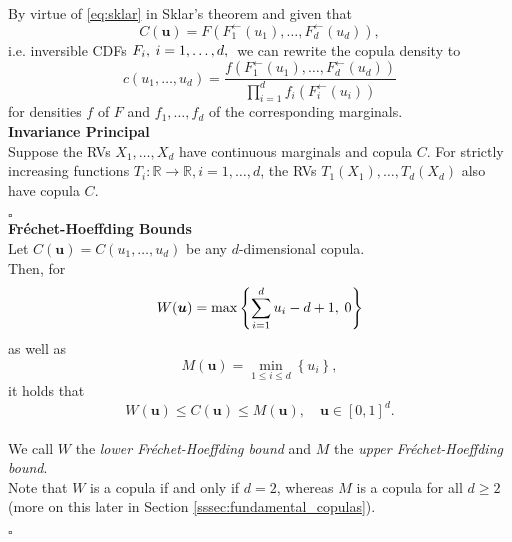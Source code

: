 By virtue of \autoref{eq:sklar} in Sklar's theorem and given that
\begin{equation} 
C(\mathbf{u})=F\left(F_{1}^{\leftarrow}\left(u_{1}\right), \ldots, F_{d}^{\leftarrow}\left(u_{d}\right)\right) ,
\label{eq:sklar_2}
\end{equation}
i.e. inversible \ac{CDF}s $ F_i, \hspace{0.25em} i = 1, \ldots, d, \hspace{0.25em}$ we can rewrite the copula density to
\begin{equation}
c\left(u_{1}, \ldots, u_{d}\right)=\frac{f\left(F_{1}^{\leftarrow}\left(u_{1}\right), \ldots, F_{d}^{\leftarrow}\left(u_{d}\right)\right)}{\prod \limits _{i=1}^{d} f_{i}\left(F_{i}^{\leftarrow}\left(u_{i}\right)\right)}
\label{eq:copula_density_2}
\end{equation}
for densities $f$ of $F$ and $f_1, \ldots, f_d$ of the corresponding marginals.\\


\textbf{Invariance Principal}\\
Suppose the \ac{RV}s $ X_1, \ldots, X_d $  have continuous marginals and copula $C$. For strictly increasing functions $T_i : \mathbb{R} \rightarrow \mathbb{R}, i = 1, \ldots, d$, the \ac{RV}s $T_1(X_1), \ldots, T_d(X_d)$ also have copula $C$.

\hfill $\square$ \\


\textbf{Fr\'echet-Hoeffding Bounds}\\
Let $C(\bm{u}) = C(u_1, \ldots, u_d)$ be any $d$-dimensional copula.\\
Then, for
\begin{equation}
W(\boldsymbol{u})=\max \left\{\sum\limits_{i=1}^{d} u_{i}-d+1, \hspace{0.25em} 0\right\}
\label{eq:frechet_hoeffding_lower}
\end{equation}
as well as
\begin{equation}
M(\boldsymbol{u})=\min \limits _{1 \leq i \leq d}\left\{u_{i}\right\},
\label{eq:frechet_hoeffding_upper}
\end{equation}
it holds that
\begin{equation}
W(\bm{u}) \leq C(\bm{u}) \leq M(\bm{u}), \quad \bm{u} \in[0,1]^{d}.
\label{eq:frechet_hoeffding}
\end{equation}\\
We call $W$ the \textit{lower Fr\'echet-Hoeffding bound} and $M$ the \textit{upper Fr\'echet-Hoeffding bound}.\\
Note that $W$ is a copula if and only if $d=2$, whereas $M$ is a copula for all $d \geq 2$ (more on this later in Section \ref{sssec:fundamental_copulas}).

\hfill $\square$ \\




